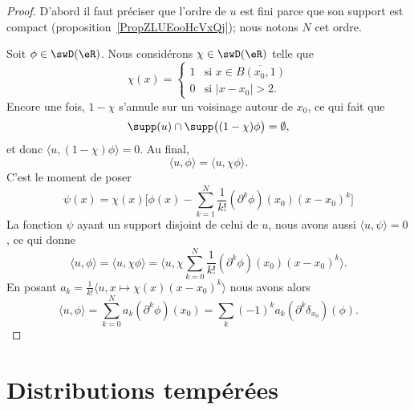 \begin{proof}
    D'abord il faut préciser que l'ordre de \( u\) est fini parce que son support est compact (proposition~\ref{PropZLUEooHcVxQj}); nous notons \( N\) cet ordre.

    Soit \( \phi\in\swD(\eR)\).  Nous considérons \( \chi\in\swD(\eR)\) telle que
    \begin{equation}
        \chi(x)=\begin{cases}
            1    &   \text{si } x\in\overline{ B(x_0,1) }\\
            0    &    \text{si } | x-x_0 |>2.
        \end{cases}
    \end{equation}
    Encore une fois, \( 1-\chi\) s'annule sur un voisinage autour de \( x_0\), ce qui fait que
    \begin{equation}
        \supp(u)\cap\supp\big( (1-\chi)\phi \big)=\emptyset,
    \end{equation}
    et donc \( \langle u, (1-\chi)\phi\rangle =0\). Au final,
    \begin{equation}
        \langle u, \phi\rangle =\langle u, \chi\phi\rangle.
    \end{equation}
    C'est le moment de poser
    \begin{equation}
        \psi(x)=\chi(x)\big[   \phi(x)-\sum_{k=1}^N\frac{1}{ k! }(\partial^k\phi)(x_0)(x-x_0)^k \big]
    \end{equation}
    La fonction \( \psi\) ayant un support disjoint de celui de \( u\), nous avons aussi \( \langle u, \psi\rangle =0\), ce qui donne
    \begin{equation}
        \langle u, \phi\rangle =\langle u, \chi\phi\rangle =\langle u, \chi\sum_{k=0}^N\frac{1}{ k! }(\partial^k\phi)(x_0)(x-x_0)^k\rangle .
    \end{equation}
    En posant \( a_k=\frac{1}{ k! }\langle u, x\mapsto \chi(x)(x-x_0)^k\rangle \) nous avons alors
    \begin{equation}
        \langle u, \phi\rangle =\sum_{k=0}^Na_k(\partial^k\phi)(x_0)=\sum_k(-1)^ka_k(\partial^k\delta_{x_0})(\phi).
    \end{equation}
\end{proof}

\section{Distributions tempérées}

